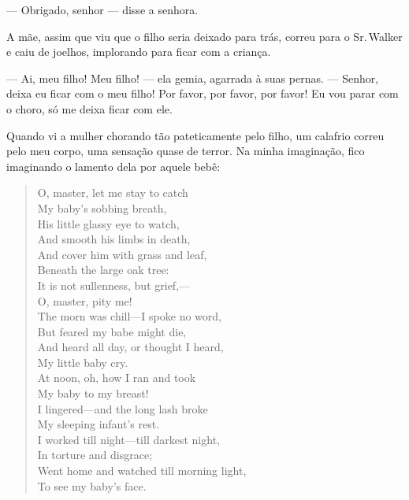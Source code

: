 --- Obrigado, senhor --- disse a senhora.

A mãe, assim que viu que o filho seria deixado para trás, correu para o
Sr.\,Walker e caiu de joelhos, implorando para ficar com a criança.

--- Ai, meu filho! Meu filho! --- ela gemia, agarrada à suas pernas. ---
Senhor, deixa eu ficar com o meu filho! Por favor, por favor, por favor!
Eu vou parar com o choro, só me deixa ficar com ele.

Quando vi a mulher chorando tão pateticamente pelo filho, um calafrio
correu pelo meu corpo, uma sensação quase de terror. Na minha
imaginação, fico imaginando o lamento dela por aquele bebê:

\begin{verse}
O, master, let me stay to catch\\
My baby's sobbing breath,\\
His little glassy eye to watch,\\
And smooth his limbs in death,\\[5pt]

And cover him with grass and leaf,\\
Beneath the large oak tree:\\
It is not sullenness, but grief,---\\
O, master, pity me!\\[5pt]

The morn was chill---I spoke no word,\\
But feared my babe might die,\\
And heard all day, or thought I heard,\\
My little baby cry.\\[5pt]

At noon, oh, how I ran and took\\
My baby to my breast!\\
I lingered---and the long lash broke\\
My sleeping infant's rest.\\[5pt]

I worked till night---till darkest night,\\
In torture and disgrace;\\
Went home and watched till morning light,\\
To see my baby's face.\\[5pt]


\end{verse}
